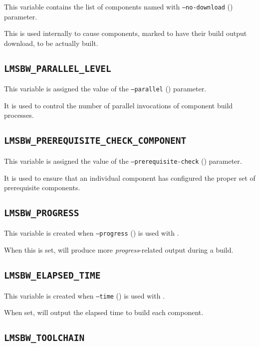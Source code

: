 This variable contains the list of components named with
\texttt{--no-download} () parameter.

This is used internally to cause components, marked to have their
build output download, to be actually built.

\subsection{\texttt{LMSBW\_PARALLEL\_LEVEL}}

This variable is assigned the value of the \texttt{--parallel}
() parameter.

It is used to control the number of parallel invocations of component
build processes.

\subsection{\texttt{LMSBW\_PREREQUISITE\_CHECK\_COMPONENT}}

This variable is assigned the value of the
\texttt{--prerequisite-check} ()
parameter.

It is used to ensure that an individual component has configured the
proper set of prerequisite components.

\subsection{\texttt{LMSBW\_PROGRESS}}

This variable is created when \texttt{--progress}
() is used with \lmsbwcmd.

When this is set, \lmsbw will produce more \emph{progress}-related
output during a build.

\subsection{\texttt{LMSBW\_ELAPSED\_TIME}}

This variable is created when \texttt{--time} ()
is used with \lmsbwcmd.

When set, \lmsbw will output the elapsed time to build each component.

\subsection{\texttt{LMSBW\_TOOLCHAIN}}

